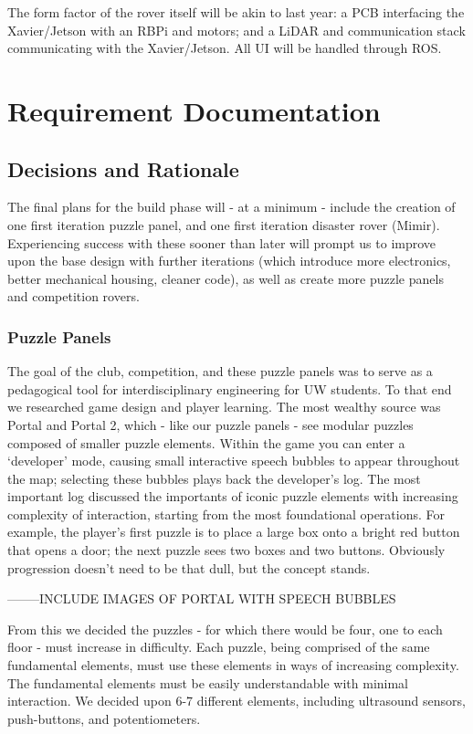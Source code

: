 \documentclass[a4paper, 10pt]{article}
\begin{document}
The form factor of the rover itself will be akin to last year: a PCB interfacing the Xavier/Jetson with an RBPi and motors; and a LiDAR and communication stack communicating with the Xavier/Jetson. All UI will be handled through ROS. 

\pagebreak
	
\section{Requirement Documentation}
	\subsection{Decisions and Rationale}
	The final plans for the build phase will - at a minimum - include the creation of one first iteration puzzle panel, and one first iteration disaster rover (Mimir). Experiencing success with these sooner than later will prompt us to improve upon the base design with further iterations (which introduce more electronics, better mechanical housing, cleaner code), as well as create more puzzle panels and competition rovers.
	
		\subsubsection*{Puzzle Panels}
		The goal of the club, competition, and these puzzle panels was to serve as a pedagogical tool for interdisciplinary engineering for UW students. To that end we researched game design and player learning. The most wealthy source was Portal and Portal 2, which - like our puzzle panels - see modular puzzles composed of smaller puzzle elements. Within the game you can enter a `developer' mode, causing small interactive speech bubbles to appear throughout the map; selecting these bubbles plays back the developer's log. The most important log discussed the importants of iconic puzzle elements with increasing complexity of interaction, starting from the most foundational operations. For example, the player's first puzzle is to place a large box onto a bright red button that opens a door; the next puzzle sees two boxes and two buttons. Obviously progression doesn't need to be that dull, but the concept stands.
		
		--------INCLUDE IMAGES OF PORTAL WITH SPEECH BUBBLES
		
		From this we decided the puzzles - for which there would be four, one to each floor - must increase in difficulty. Each puzzle, being comprised of the same fundamental elements, must use these elements in ways of increasing complexity. The fundamental elements must be easily understandable with minimal interaction. We decided upon 6-7 different elements, including ultrasound sensors, push-buttons, and potentiometers.
		
\end{document}

